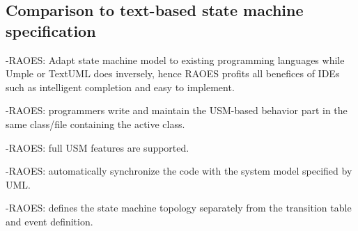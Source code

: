 \subsection{Comparison to text-based state machine specification}
-RAOES: Adapt state machine model to existing programming languages while Umple or TextUML does inversely, hence RAOES profits all benefices of IDEs such as intelligent completion and easy to implement. 

-RAOES: programmers write and maintain the USM-based behavior part in the same class/file containing the active class.

-RAOES: full USM features are supported.

-RAOES: automatically synchronize the code with the system model specified by UML.

-RAOES: defines the state machine topology separately from the transition table and event definition.